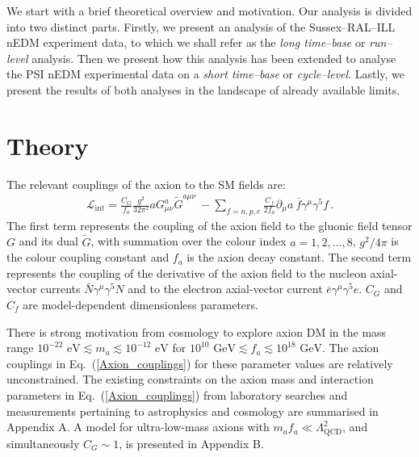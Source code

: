 
 We start with a brief theoretical overview and motivation. Our analysis is divided into two distinct parts. Firstly, we present an analysis of the Sussex--RAL--ILL nEDM experiment data, to which we shall refer as the \emph{long time--base} or \emph{run--level} analysis.  Then we present how this analysis has been extended to analyse the PSI nEDM experimental data on a \emph{short time--base} or \emph{cycle--level}. Lastly, we present the results of both analyses in the landscape of already available limits.


\section{Theory}
The relevant couplings of the axion to the SM fields are:
\begin{align}
\label{Axion_couplings}
\mathcal{L}_{\textrm{int}} = \frac{C_G}{f_a} \frac{g^2}{32\pi^2} a G^{a}_{\mu \nu} \tilde{G}^{a \mu \nu}  ~ - \sum_{f=n,p,e} \frac{C_f}{2f_a} \partial_\mu a ~ \bar{f} \gamma^\mu \gamma^5 f \, .
\end{align}
The first term represents the coupling of the axion field to the gluonic field tensor $G$ and its dual $\tilde{G}$, with summation over the colour index $a=1,2,...,8$, $g^2 / 4 \pi$ is the colour coupling constant and $f_a$ is the axion decay constant. The second term represents the coupling of the derivative of the axion field to the nucleon axial-vector currents $\bar{N} \gamma^\mu \gamma^5 N$ and to the electron axial-vector current $\bar{e} \gamma^\mu \gamma^5 e$.
$C_G$ and $C_f$ are model-dependent dimensionless parameters.

There is strong motivation from cosmology to explore axion DM in the mass range $10^{-22}\text{ eV}\lesssim m_a \lesssim 10^{-12}\text{ eV}$ for $10^{10}\text{ GeV}\lesssim f_a \lesssim 10^{18}\text{ GeV}$.
The axion couplings in Eq.~(\ref{Axion_couplings}) for these parameter values are relatively unconstrained.
The existing constraints on the axion mass and interaction parameters in Eq.~(\ref{Axion_couplings}) from laboratory searches and measurements pertaining to astrophysics and cosmology are summarised in Appendix A.
A model for ultra-low-mass axions with $m_af_a\ll \Lambda_{\mathrm{QCD}}^2$, and simultaneously $C_G\sim 1$, is presented in Appendix B.

